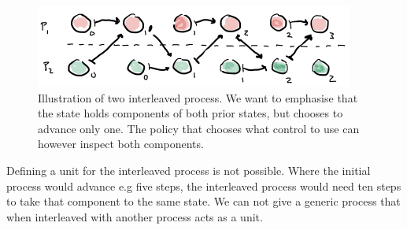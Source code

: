 \documentclass[sigplan,review]{acmart}\settopmatter{printfolios=true,printccs=false,printacmref=false}
\begin{document}
\begin{figure}
\centering
\includegraphics[scale=0.7]{images/interleave.png}
\caption{Illustration of two interleaved process. We want to emphasise that the state holds components of both prior states, but chooses to advance only one. The policy that chooses what control to use can however inspect both components.}
\label{images:interleave}
\end{figure}

%
Defining a unit for the interleaved process is not possible.
%
Where the initial process would advance e.g five steps, the interleaved process would need ten steps to take that component to the same state.
%
We can not give a generic process that when interleaved with another process acts as a unit.
\end{document}
